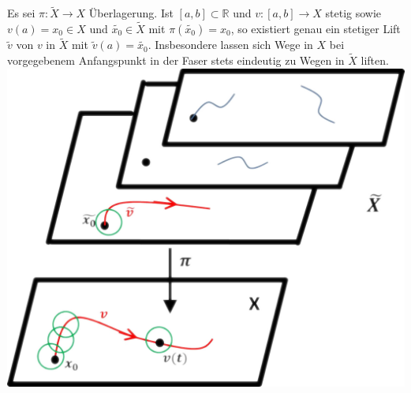 \documentclass[a4paper,11pt,notitlepage]{report}
\theoremstyle{definition}
\newcommand{\R}{{\ensuremath{\mathbb{R}}}}
\begin{document}
\begin{theorem}
	Es sei $\pi \colon \widetilde{X} \rightarrow X$ Überlagerung. 
	\newline
	Ist $[a,b] \subset \R$ und $v \colon [a,b] \rightarrow X$ stetig sowie
	$v(a)=x_0 \in X$ und $\widetilde{x_0} \in \widetilde{X}$ mit $\pi(\widetilde{x_0}) = x_0$, so existiert genau ein stetiger Lift $\widetilde{v}$ von $v$ in $\widetilde{X}$ mit $\widetilde{v}(a) = \widetilde{x_0}$.
	Insbesondere lassen sich Wege in $X$ bei vorgegebenem Anfangspunkt in der Faser stets eindeutig zu Wegen in $\widetilde{X}$ liften.
\newline
\includegraphics[scale=0.4]{images/Lift_nicht_stetig.png}
\end{theorem}
\end{document}
